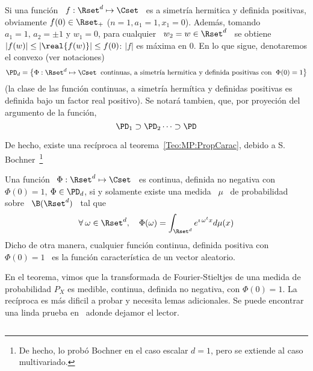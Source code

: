 {Si una  funci\'on \  $f: \Rset^d \mapsto  \Cset$ \  es a simetr\'ia  hermitica y
definida  positivas, obviamente  $f(0) \in  \Rset_+$ ($n  = 1,  a_1 =  1,  x_1 =
0$). Adem\'as, tomando $a_1  = 1, \, a_2 = \pm 1$ y $w_1  = 0$, para cualquier \
$w_2 = w \in \Rset^d$ \ se obtiene \ $\left| f(w) \right| \le \left| \real{f(w)}
\right| \le  f(0)$: $|f|$ es m\'axima en  $0$.  En lo que  sigue, denotaremos el
convexo (ver notaciones)
%
\[
\PD_d =  \big\{ \Phi:  \Rset^d \mapsto \Cset  \: \mbox{ continuas,  a simetr\'ia
  hermitica y definida positivas con } \: \Phi(0) = 1 \big\}
\]
%
(la  clase de  las funci\'on  continuas,  a simetr\'ia  herm\'itica y  definidas
positivas es definida  bajo un factor real positivo).  Se notar\'a tambien, que,
por proyeci\'on del argumento de la funci\'on,
%
\[
\PD_1 \supset \PD_2 \cdots \supset \PD
\]
%

De  hecho, existe  una rec\'iproca  al teorema~\ref{Teo:MP:PropCarac},  debido a
S. Bochner~\footnote{De  hecho, lo prob\'o Bochner  en el caso escalar  $d = 1$,
  pero  se extiende  al  caso multivariado.}~\cite{Boc32,  Boc59, Gol61,  Pin09,
  Sas13}
%
\begin{teorema}[Bochner]\label{Teo:MP:Bochner}
%
  Una  funci\'on \  $\Phi: \Rset^d  \mapsto \Cset$  \ es  continua,  definida no
  negativa con \ $\Phi(0) = 1$, \ie  $\Phi \in \PD_d$, si y solamente existe una
  medida \ $\mu$ \ de probabilidad sobre \ $\B(\Rset^d)$ \ tal que
  \[
  \forall \:  \omega \in \Rset^d, \quad \Phi(\omega)  = \int_{\Rset^d} e^{\imath
    \, \omega^t x} d\mu(x)
  \]
  Dicho de  otra manera, cualquier  funci\'on continua, definida positiva  con \
  $\Phi(0) = 1$ \ es la funci\'on caracter\'istica de un vector aleatorio.
\end{teorema}
%
En el teorema,  vimos que la transformada de Fourier-Stieltjes  de una medida de
probabilidad $P_X$  es medible, continua,  definida no negativa, con  $\Phi(0) =
1$. La  rec\'iproca es m\'as dificil  a probar y necesita  lemas adicionales. Se
puede  encontrar una  linda prueba  en~\cite[Sec.~1.7]{Sas13} adonde  dejamor el
lector.

%
\[
\]

}
